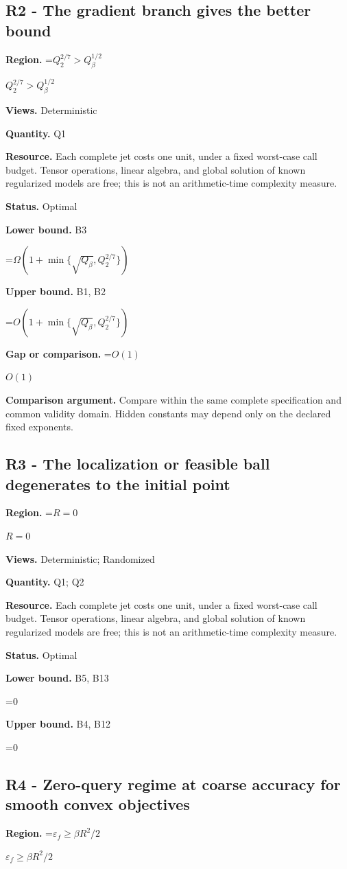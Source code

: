 \documentclass[10pt,a4paper]{article}
\newcommand{\AtlasMath}[1]{\par\begingroup\centering\setbox0=\hbox{$\displaystyle #1$}\ifdim\wd0>1.4\linewidth\typeout{ATLAS WIDE FORMULA: \the\wd0}\fi\ifdim\wd0>\linewidth\resizebox{\linewidth}{!}{\box0}\else\box0\fi\par\endgroup}
\newcommand{\AtlasInlineMath}[1]{\begingroup\setbox0=\hbox{$#1$}\ifdim\wd0>.4\linewidth\endgroup\AtlasMath{#1}\else\endgroup$#1$\fi}
\begin{document}
\subsection{R2 - The gradient branch gives the better bound}
\textbf{Region.} \AtlasInlineMath{Q_2^{2/7}>Q_\beta^{1/2}}

\textbf{Views.} Deterministic

\textbf{Quantity.} Q1

\textbf{Resource.} Each complete jet costs one unit, under a fixed worst-case call budget. Tensor operations, linear algebra, and global solution of known regularized models are free; this is not an arithmetic-time complexity measure.

\textbf{Status.} Optimal

\textbf{Lower bound.} B3

\AtlasMath{\Omega(1+\min\{\sqrt{Q_\beta},Q_2^{2/7}\})}
\textbf{Upper bound.} B1, B2

\AtlasMath{O(1+\min\{\sqrt{Q_\beta},Q_2^{2/7}\})}
\textbf{Gap or comparison.} \AtlasInlineMath{O(1)}

\textbf{Comparison argument.} Compare within the same complete specification and common validity domain. Hidden constants may depend only on the declared fixed exponents.

\subsection{R3 - The localization or feasible ball degenerates to the initial point}
\textbf{Region.} \AtlasInlineMath{R=0}

\textbf{Views.} Deterministic; Randomized

\textbf{Quantity.} Q1; Q2

\textbf{Resource.} Each complete jet costs one unit, under a fixed worst-case call budget. Tensor operations, linear algebra, and global solution of known regularized models are free; this is not an arithmetic-time complexity measure.

\textbf{Status.} Optimal

\textbf{Lower bound.} B5, B13

\AtlasMath{0}
\textbf{Upper bound.} B4, B12

\AtlasMath{0}
\subsection{R4 - Zero-query regime at coarse accuracy for smooth convex objectives}
\textbf{Region.} \AtlasInlineMath{\varepsilon_f\ge\beta R^2/2}
\end{document}
